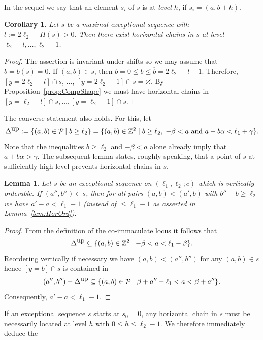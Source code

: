\documentclass[11pt]{article}
\newtheorem{lemma}[theo]{Lemma}
\newtheorem{coro}[theo]{Corollary}
\theoremstyle{definition}
\numberwithin{equation}{section}
\newcommand{\cP}{\mathcal{P}}
\newcommand{\Z}{\mathbb Z}
\newcommand{\kst }{\,|\;}
\newcommand{\xa}{\alpha}
\newcommand{\xb}{\beta}
\newcommand{\xc}{{\gamma}}
\newcommand{\cl}{s}
\newcommand{\DeltaUp}{\Delta^{\mbox{\tiny up}}}
\newcommand{\nl}{{l}}
\newcommand{\mes}{maximal exceptional sequence}
\begin{document}
{In the sequel we say that an element $\cl_i$ 
of $\cl$ is at {\em level $h$}, if $\cl_i=(a,\underline b+h)$.}

\begin{coro}
\label{coro:ExHorChains}
Let $\cl$ be a {\mes} with 
$\nl:=2\ell_2-H(\cl)>0$. 
Then there {exist} 
horizontal chains in $\cl$ at level 
$\ell_2-\nl,\ldots,\ell_2-1$. 
\end{coro}

\begin{proof}
{The assertion is invariant under shifts 
so we may assume that $\underline b=\underline b(\cl)=0$. If 
$(a,b)\in\cl$, then $\underline b=0\leq b\leq\overline b=
2\ell_2-\nl-1$. Therefore,  
$[y=2\ell_2-\nl]\cap\cl$, $\ldots$, $[y=2\ell_2-1]
\cap\cl=\varnothing$. By 
Proposition~\ref{prop:CompShape} we must have 
horizontal chains in $[y=\ell_2-\nl]\cap\cl,
\ldots,[y=\ell_2-1]\cap\cl$.}
\end{proof}

The converse statement also holds.
For this, let
$$
\DeltaUp:=\{(a,b)\in\cP\kst b\geq\ell_2\}
=\{(a,b)\in\Z^2\mid b\geq\ell_2,\; -\xb<a
\mbox{ and }a+b\xa<\ell_1+\xc\}.
$$
Note that the inequalities $b\geq\ell_2$ 
and $-\xb<a$ alone already imply that 
$a+b\xa>\xc$. The subsequent lemma states, 
roughly speaking, that a point of $\cl$ 
at sufficiently high level prevents horizontal 
chains in $\cl$.

\begin{lemma}
\label{lem:HeightConstraint}
Let $\cl$ be an exceptional sequence 
on $(\ell_1,\ell_2;c)$ which is
vertically orderable. If $(a'',b'')\in\cl$, 
then for all pairs $(a,b)<(a',b)$ 
with $b''-b\geq\ell_2$ we have 
$a'-a<\ell_1-1$ (instead of $\leq\ell_1-1$
as asserted in Lemma~\ref{lem:HorOrd}).
\end{lemma}

\begin{proof}
From the definition of the {co-immaculate} 
locus it follows that 
$$
\DeltaUp\subseteq\{(a,b)\in\Z^2\mid-\xb
<a<\ell_1-\xb\}.
$$
Reordering vertically if necessary 
we have $(a,b)<(a'',b'')$ for any 
$(a,b)\in\cl$ hence $[y=b]\cap\cl$ 
is contained in
$$
(a'',b'')-\DeltaUp\subseteq\{(a,b)\in
\cP\mid\xb+a''-\ell_1<a<\xb+a''\}.
$$
Consequently, $a'-a<\ell_1-1$.
\end{proof}

If an exceptional sequence $\cl$ 
starts at $\cl_0=0$, any horizontal chain 
in $\cl$ must be necessarily located at 
level $h$ with $0\leq h\leq\ell_2-1$. 
We therefore immediately deduce the
\end{document}
